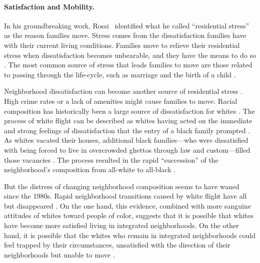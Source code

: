 \documentclass{baderart}
\begin{document}
\paragraph{Satisfaction and Mobility.}\label{satisfaction-and-mobility}

In his groundbreaking work, Rossi~\citeyearpar{rossi_why_1955} identified what he called ``residential stress'' as the reason families move. Stress comes from the dissatisfaction families have with their current living conditions. Families move to relieve their residential stress when dissatisfaction becomes unbearable, and they have the means to do so \citep{speare_residential_1974, speare_residential_1975}. The most common source of stress that leads families to move are those related to passing through the life-cycle, such as marriage and the birth of a child \citep{rossi_why_1955, clark_interpreting_2015, krysan_cycle_2017}. 

Neighborhood dissatisfaction can become another source of residential stress \citep{woldoff_effects_2002}. High crime rates or a lack of amenities might cause families to move. Racial composition has historically been a large source of dissatisfaction for whites \citep{crowder_racial_2000, crowder_spatial_2008}. The process of white flight can be described as whites having acted on the immediate and strong feelings of dissatisfaction that the entry of a black family prompted \citep{boustan_was_2010}. As whites vacated their houses, additional black families---who were dissatisfied with being forced to live in overcrowded ghettos through law and custom---filled those vacancies \citep{sugrue_origins_1996, woldoff_white_2011}. The process resulted in the rapid ``succession'' of the neighborhood's composition from all-white to all-black \citep{duncan_negro_1957}.

But the distress of changing neighborhood composition seems to have waned since the 1980s. Rapid neighborhood transitions caused by white flight have all but disappeared \citep{ellen_sharing_2000, friedman_declines_2008, bader_fragmented_2016}. On the one hand, this evidence, combined with more sanguine attitudes of whites toward people of color, suggests that it is possible that whites have become more satisfied living in integrated neighborhoods. On the other hand, it is possible that the whites who remain in integrated neighborhoods could feel trapped by their circumstances, unsatisfied with the direction of their neighborhoods but unable to move \citep{south_leaving_1998}. 
\end{document}
